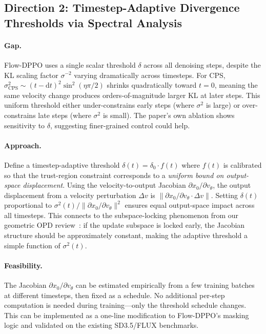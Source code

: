 \documentclass[11pt,a4paper]{article}
\begin{document}
\subsection{Direction 2: Timestep-Adaptive Divergence Thresholds via Spectral Analysis}

\paragraph{Gap.} Flow-DPPO uses a single scalar threshold $\delta$ across all denoising steps, despite the KL scaling factor $\sigma^{-2}$ varying dramatically across timesteps. For CPS, $\sigma_{\mathrm{CPS}}^2 \sim (t\!-\!\mathrm{d}t)^2 \sin^2(\eta\pi/2)$ shrinks quadratically toward $t=0$, meaning the same velocity change produces orders-of-magnitude larger KL at later steps. This uniform threshold either under-constrains early steps (where $\sigma^2$ is large) or over-constrains late steps (where $\sigma^2$ is small). The paper's own ablation shows sensitivity to $\delta$, suggesting finer-grained control could help.

\paragraph{Approach.} Define a timestep-adaptive threshold $\delta(t) = \delta_0 \cdot f(t)$ where $f(t)$ is calibrated so that the trust-region constraint corresponds to a \emph{uniform bound on output-space displacement}. Using the velocity-to-output Jacobian $\partial x_0 / \partial v_\theta$, the output displacement from a velocity perturbation $\Delta v$ is $\|\partial x_0 / \partial v_\theta \cdot \Delta v\|$. Setting $\delta(t)$ proportional to $\sigma^2(t) / \|\partial x_0 / \partial v_\theta\|^2$ ensures equal output-space impact across all timesteps. This connects to the subspace-locking phenomenon from our geometric OPD review~\cite{shen2026geometry}: if the update subspace is locked early, the Jacobian structure should be approximately constant, making the adaptive threshold a simple function of $\sigma^2(t)$.

\paragraph{Feasibility.} The Jacobian $\partial x_0 / \partial v_\theta$ can be estimated empirically from a few training batches at different timesteps, then fixed as a schedule. No additional per-step computation is needed during training---only the threshold schedule changes. This can be implemented as a one-line modification to Flow-DPPO's masking logic and validated on the existing SD3.5/FLUX benchmarks.
\end{document}
